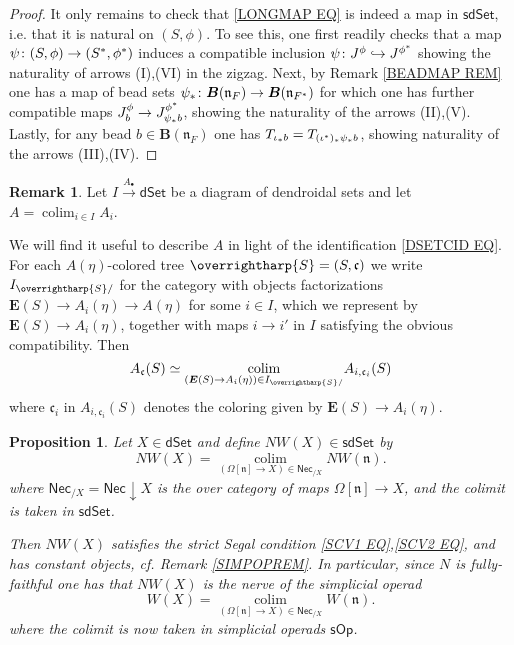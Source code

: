 \documentclass[a4paper,10pt]{article}%
\numberwithin{equation}{section}
\numberwithin{figure}{section}
\newtheorem{proposition}[equation]{Proposition}%
\theoremstyle{definition} %
\newtheorem{remark}[equation]{Remark}%
\newcommand{\vect}[1]{\text{\overrightharp{\ensuremath{#1}}}}
\DeclareMathOperator{\colim}{colim}
\begin{document}
\begin{proof}
	It only remains to check that
	\eqref{LONGMAP EQ}
	is indeed a map in 
	$\mathsf{sdSet}$, i.e. that it is natural on 
	$(S,\phi)$.
	To see this, one first readily checks that a map
	$\psi \colon (S,\phi) \to (S^{\**},\phi^{\**})$
	induces a compatible inclusion
	$\psi \colon J^{\phi} \hookrightarrow J^{\phi^{\**}}$
	showing the naturality of arrows (I),(VI) 
	in the zigzag.
%
	Next, by Remark \ref{BEADMAP REM}
	one has a map of bead sets
	$\psi_{\**} \colon 
	\boldsymbol{B}(\mathfrak{n}_{F})
	\to
	\boldsymbol{B}(\mathfrak{n}_{F^{\**}})$
	for which one has further compatible maps
	$J^{\phi}_b
	\to 
	J^{\phi^{\**}}_{\psi_{\**}b}$,
	showing the naturality of the arrows (II),(V).
	Lastly, for any bead 
	$b \in \boldsymbol{B}(\mathfrak{n}_{F})$
	one has
	$T_{\iota_{\**}b} = T_{(\iota^{\**})_{\**} \psi_{\**}b}$,
	showing naturality of the arrows (III),(IV).
\end{proof}



\begin{remark}\label{PREOPCOLEV REM}
	Let $I \xrightarrow{A_{\bullet}} \mathsf{dSet}$
	be a diagram of dendroidal sets and let
	$A = \colim_{i \in I} A_i$.

	We will find it useful to describe $A$
	in light of the identification \eqref{DSETCID EQ}.
	For each $A(\eta)$-colored tree 
	$\vect{S} = (S,\mathfrak{c})$
	we write
	$I_{\vect{S}/}$
	for the category with objects factorizations
	$\boldsymbol{E}(S) \to A_i(\eta) \to A(\eta)$ 
	for some $i \in I$,
	which we represent by 
	$\boldsymbol{E}(S) \to A_i(\eta)$,
	together with maps $i \to i'$ in $I$
	satisfying the obvious compatibility.
%	
	Then
\begin{equation}\label{COLIMALT EQ}
	A_{\mathfrak{c}}(S) \simeq 
	\underset{(\boldsymbol{E}(S) \to A_i(\eta)) \in I_{\vect{S}/}}{\colim}
	A_{i,
	\mathfrak{c}_i}(S)
\end{equation}
	where $\mathfrak{c}_i$ in 
	$A_{i,\mathfrak{c}_i}(S)$
	denotes the coloring given by
	$\boldsymbol{E}(S) \to A_i(\eta)$.
\end{remark}



\begin{proposition}\label{NWKANEX_PROP}
	Let $X \in \mathsf{dSet}$ and define
	$NW(X) \in \mathsf{sdSet}$ by
	\begin{equation}\label{NWKANEX EQ}
	NW(X) =
	\underset{(\Omega[\mathfrak{n}] \to X)
		\in \mathsf{Nec}_{/X}}{\colim}
	NW(\mathfrak{n}).
	\end{equation}
	where
	$\mathsf{Nec}_{/X} = \mathsf{Nec} \downarrow X$ is the over category of maps $\Omega[\mathfrak{n}] \to X$, and
	the colimit is taken in $\mathsf{sdSet}$.

	Then $NW(X)$ satisfies the strict Segal condition
	\eqref{SCV1 EQ},\eqref{SCV2 EQ},
	and has constant objects, cf. Remark \ref{SIMPOPREM}.
	In particular, since $N$ is fully-faithful one has that
	$NW(X)$ is the nerve of the simplicial operad
\[
	W(X) =
	\underset{
	(\Omega[\mathfrak{n}] \to X)
	\in \mathsf{Nec}_{/X}}{\colim}
	W(\mathfrak{n}).
\]
	where the colimit is now taken in simplicial operads
	$\mathsf{sOp}$.
\end{proposition}
\end{document}
